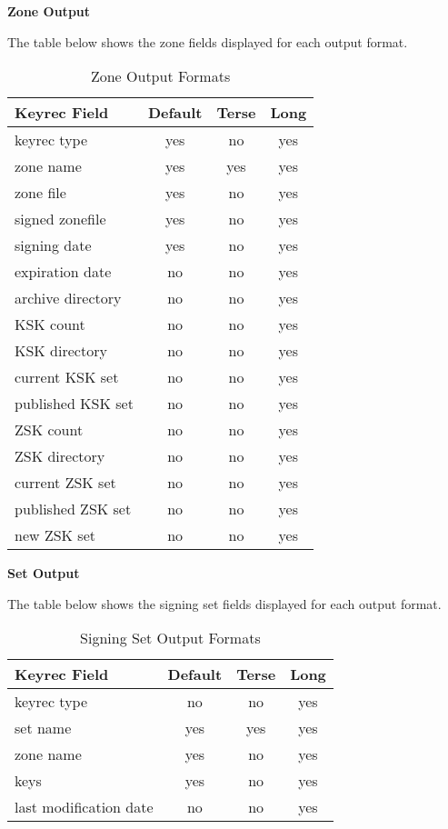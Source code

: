\eject

{\bf Zone  Output}

The table below shows the zone  fields displayed for each
output format.

\begin{table}[ht]
\begin{center}
\begin{tabular}{|l|c|c|c|}
\hline
{\bf Keyrec Field} & {\bf Default} & {\bf Terse} & {\bf Long} \\
\hline
keyrec type       & yes & no  & yes \\
zone name         & yes & yes & yes \\
zone file         & yes & no  & yes \\
signed zonefile   & yes & no  & yes \\
signing date      & yes & no  & yes \\
expiration date   & no  & no  & yes \\
archive directory & no  & no  & yes \\
KSK count         & no  & no  & yes \\
KSK directory     & no  & no  & yes \\
current KSK set   & no  & no  & yes \\
published KSK set & no  & no  & yes \\
ZSK count         & no  & no  & yes \\
ZSK directory     & no  & no  & yes \\
current ZSK set   & no  & no  & yes \\
published ZSK set & no  & no  & yes \\
new ZSK set       & no  & no  & yes \\
\hline
\end{tabular}
\end{center}
\caption{ Zone Output Formats}
\end{table}

{\bf Set  Output}

The table below shows the signing set  fields displayed for each
output format.

\begin{table}[ht]
\begin{center}
\begin{tabular}{|l|c|c|c|}
\hline
{\bf Keyrec Field} & {\bf Default} & {\bf Terse} & {\bf Long} \\
\hline
keyrec type            & no  & no  & yes \\
set name               & yes & yes & yes \\
zone name              & yes & no  & yes \\
keys                   & yes & no  & yes \\
last modification date & no  & no  & yes \\
\hline
\end{tabular}
\end{center}
\caption{ Signing Set Output Formats}
\end{table}

